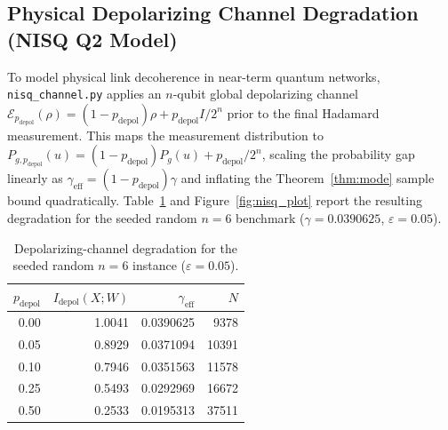 \documentclass[10pt,twocolumn]{article}
\theoremstyle{definition}
\begin{document}
\subsection{Physical Depolarizing Channel Degradation (NISQ Q2 Model)}

To model physical link decoherence in near-term quantum networks, \texttt{nisq\_channel.py} applies an $n$-qubit global depolarizing channel $\mathcal{E}_{p_{\mathrm{depol}}}(\rho) = (1 - p_{\mathrm{depol}})\rho + p_{\mathrm{depol}} I / 2^n$ prior to the final Hadamard measurement. This maps the measurement distribution to $P_{g,p_{\mathrm{depol}}}(u) = (1 - p_{\mathrm{depol}})P_g(u) + p_{\mathrm{depol}}/2^n$, scaling the probability gap linearly as $\gamma_{\mathrm{eff}} = (1 - p_{\mathrm{depol}})\gamma$ and inflating the Theorem~\ref{thm:mode} sample bound quadratically. Table~\ref{tab:nisq} and Figure~\ref{fig:nisq_plot} report the resulting degradation for the seeded random $n=6$ benchmark ($\gamma=0.0390625$, $\varepsilon=0.05$).

\begin{table}[t]
\centering
\caption{Depolarizing-channel degradation for the seeded random $n=6$ instance ($\varepsilon = 0.05$).}
\label{tab:nisq}
\begin{tabular}{rrrr}
\toprule
$p_{\mathrm{depol}}$ & $I_{\mathrm{depol}}(X;W)$ &
$\gamma_{\mathrm{eff}}$ & $N$ \\
\midrule
0.00 & 1.0041 & 0.0390625 & 9378 \\
0.05 & 0.8929 & 0.0371094 & 10391 \\
0.10 & 0.7946 & 0.0351563 & 11578 \\
0.25 & 0.5493 & 0.0292969 & 16672 \\
0.50 & 0.2533 & 0.0195313 & 37511 \\
\bottomrule
\end{tabular}
\end{table}
\end{document}
